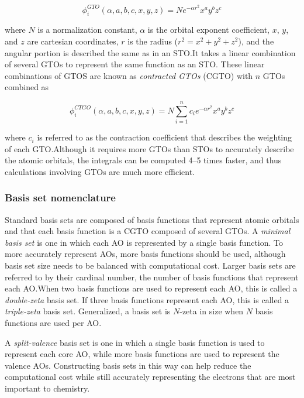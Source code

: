 \begin{equation}
\phi_i^{GTO}(\alpha,a,b,c,x,y,z) = N e^{-\alpha r^2} x^a y^b z^c
\end{equation}

\noindent where $N$ is a normalization constant, $\alpha$ is the orbital
exponent coefficient, $x$, $y$, and $z$ are cartesian coordinates, $r$ is the
radius ($r^2=x^2+y^2+z^2$), and the angular portion is described the same as in
an STO.\@ It takes a linear combination of several GTOs to represent the same
function as an STO. These linear combinations of GTOS are known as
\emph{contracted GTOs} (CGTO) with $n$ GTOs combined as

\begin{equation}
\phi_i^{CTGO}(\alpha,a,b,c,x,y,z) = N \sum_{i=1}^n c_i e^{-\alpha r^2} x^a y^b z^c
\end{equation}

\noindent where $c_i$ is referred to as the contraction coefficient that
describes the weighting of each GTO.\@ Although it requires more GTOs than STOs
to accurately describe the atomic orbitals, the integrals can be computed 4--5
times faster, and thus calculations involving GTOs are much more
efficient.\cite{Gill1994}

\subsubsection{Basis set nomenclature}

Standard basis sets are composed of basis functions that represent atomic
orbitals and that each basis function is a CGTO composed of several GTOs. A
\emph{minimal basis set} is one in which each AO is represented by a single
basis function. To more accurately represent AOs, more basis functions should
be used, although basis set size needs to be balanced with computational cost.
Larger basis sets are referred to by their cardinal number, the number of basis
functions that represent each AO.\@ When two basis functions are used to
represent each AO, this is called a \emph{double-zeta} basis set. If three
basis functions represent each AO, this is called a \emph{triple-zeta} basis
set. Generalized, a basis set is $N$-zeta in size when $N$ basis functions are
used per AO.\@

A \emph{split-valence} basis set is one in which a single basis function is
used to represent each core AO, while more basis functions are used to
represent the valence AOs. Constructing basis sets in this way can help reduce
the computational cost while still accurately representing the electrons that
are most important to chemistry.

